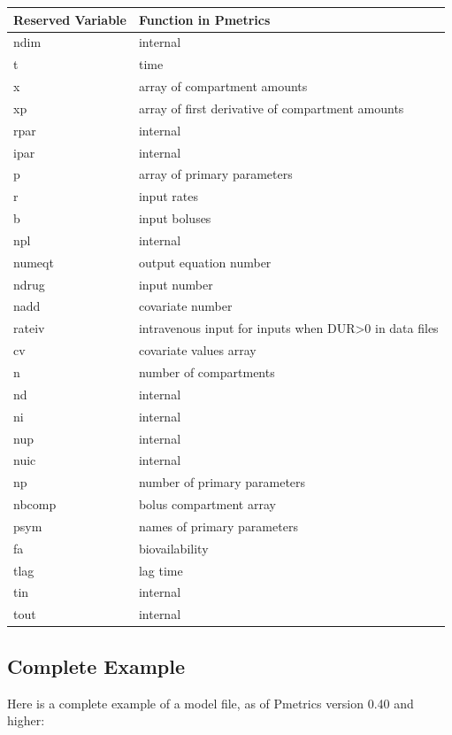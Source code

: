 \documentclass[
]{book}
\begin{document}
\begin{tabular}{l|l}
\hline
Reserved Variable & Function in Pmetrics\\
\hline
ndim & internal\\
\hline
t & time\\
\hline
x & array of compartment amounts\\
\hline
xp & array of first derivative of compartment amounts\\
\hline
rpar & internal\\
\hline
ipar & internal\\
\hline
p & array of primary parameters\\
\hline
r & input rates\\
\hline
b & input boluses\\
\hline
npl & internal\\
\hline
numeqt & output equation number\\
\hline
ndrug & input number\\
\hline
nadd & covariate number\\
\hline
rateiv & intravenous input for inputs when DUR>0 in data files\\
\hline
cv & covariate values array\\
\hline
n & number of compartments\\
\hline
nd & internal\\
\hline
ni & internal\\
\hline
nup & internal\\
\hline
nuic & internal\\
\hline
np & number of primary parameters\\
\hline
nbcomp & bolus compartment array\\
\hline
psym & names of primary parameters\\
\hline
fa & biovailability\\
\hline
tlag & lag time\\
\hline
tin & internal\\
\hline
tout & internal\\
\hline
\end{tabular}

\hypertarget{completeEx}{%
\subsection{Complete Example}\label{completeEx}}

Here is a complete example of a model file, as of Pmetrics version 0.40
and higher:
\end{document}
